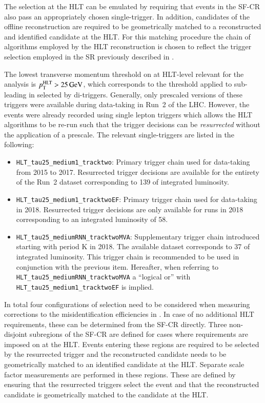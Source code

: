 The selection at the HLT can be emulated by requiring that events in
the SF-CR also pass an appropriately chosen single-\tauhadvis trigger.
In addition, \tauhadvis candidates of the offline \tauhadvis
reconstruction are required to be geometrically matched to a
reconstructed and identified \tauhadvis candidate at the HLT. For this
matching procedure the chain of algorithms employed by the HLT
\tauhadvis reconstruction is chosen to reflect the trigger selection
employed in the \hadhad SR previously described in
.

The lowest transverse momentum threshold on \tauhadvis at HLT-level
relevant for the analysis is $p_{\text{T}}^{\text{HLT}} > \SI{25}{\ensuremath{\text{GeV}}}$, which
corresponds to the threshold applied to \tauhadvis sub-leading in \pT
selected by di-\tauhadvis triggers. Generally, only prescaled versions
of these triggers were available during data-taking in Run~2 of the
LHC. However, the events were already recorded using single lepton
triggers which allows the HLT algorithms to be re-run such that the
trigger decisions can be \textit{resurrected} without the application
of a prescale. The relevant single-\tauhadvis triggers are listed in
the following:%
\begin{itemize}
\item \verb|HLT_tau25_medium1_tracktwo|: Primary trigger chain used
  for data-taking from 2015 to 2017. Resurrected trigger decisions are
  available for the entirety of the Run~2 dataset corresponding to
  \SI{139}{\ifb} of integrated luminosity.

\item \verb|HLT_tau25_medium1_tracktwoEF|: Primary trigger chain used
  for data-taking in 2018. Resurrected trigger decisions are only
  available for runs in 2018 corresponding to an integrated luminosity
  of \SI{58}{\ifb}.

\item \verb|HLT_tau25_mediumRNN_tracktwoMVA|: Supplementary trigger
  chain introduced starting with period K in 2018. The available
  dataset corresponds to \SI{37}{\ifb} of integrated luminosity.  This
  trigger chain is recommended to be used in conjunction with the
  previous item. Hereafter, when referring to
  \verb|HLT_tau25_mediumRNN_tracktwoMVA| a ``logical or'' with
  \verb|HLT_tau25_medium1_tracktwoEF| is implied.
\end{itemize}

In total four configurations of \tauhadvis selection need to be
considered when measuring corrections to the \jettotauhadvis
misidentification efficiencies in \ttbar. In case of no additional HLT
requirements, these can be determined from the SF-CR directly. Three
non-disjoint subregions of the SF-CR are defined for cases where
requirements are imposed on \tauhadvis at the HLT. Events entering
these regions are required to be selected by the resurrected trigger
and the reconstructed \tauhadvis candidate needs to be geometrically
matched to an identified \tauhadvis candidate at the HLT. Separate
scale factor measurements are performed in these regions. These are defined
by ensuring that the resurrected triggers select the event and that
the reconstructed \tauhadvis candidate is geometrically matched to the
\tauhadvis candidate at the HLT.

